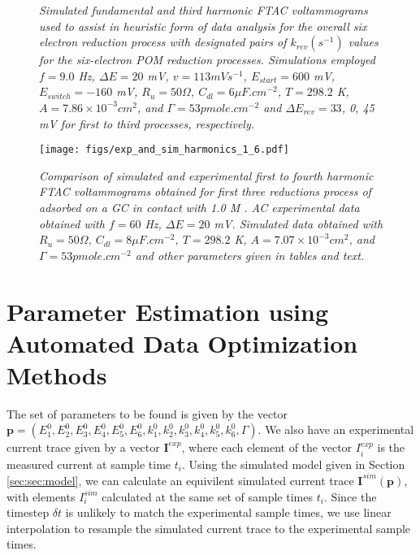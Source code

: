 \documentclass[a4paper, 12pt]{article}
\begin{document}
\begin{figure}[h]
    \caption{\it{Simulated fundamental and third harmonic FTAC voltammograms 
    used to assist in heuristic form of data analysis for the overall six 
    electron reduction process with designated pairs of $k_{rev} (s^{-1})$ 
    values for the six-electron POM reduction processes. Simulations employed $f 
    = 9.0$ Hz, $\Delta E = 20$ mV, $v = 113 mV s^{-1}$, $E_{start} = 600$ mV, 
    $E_{switch} = -160$ mV, $R_u = 50 \Omega$, $C_{dl} = 6 \mu F.cm^{-2}$, $T = 
    298.2$ K, $A = 7.86 \times 10^{-3} cm^2$, and $\Gamma = 53 pmole.cm^{-2}$ 
    and $\Delta E_{rev} = 33$, 0, 45 mV for first to third processes, 
    respectively.}}
    \label{fig:sim_for_heuristic_k}
\end{figure}

\begin{figure}[h]
\texttt{[image: figs/exp\_and\_sim\_harmonics\_1\_6.pdf]}
    \caption{\it{Comparison of simulated and experimental first to fourth 
    harmonic FTAC voltammograms obtained for first three reductions process of 
     adsorbed on a GC in contact with 1.0 M . AC 
    experimental data obtained with $f = 60$ Hz, $\Delta E = 20$ mV. Simulated 
    data obtained with $R_u = 50 \Omega$, $C_{dl} = 8 \mu F.cm^{-2}$, $T = 
    298.2$ K, $A = 7.07 \times 10^{-3} cm^2$, and $\Gamma = 53 pmole.cm^{-2}$ 
    and other parameters given in tables and text.}}
    \label{fig:sim_and_exp}
\end{figure}


\section{Parameter Estimation using Automated Data Optimization Methods}

The set of parameters to be found is given by the vector $\mathbf{p} =
(E^0_1,E^0_2,E^0_3,E^0_4,E^0_5,E^0_6,k^0_1,k^0_2,k^0_3,k^0_4,k^0_5,k^0_6,\Gamma)$.
We also have an experimental current trace given by a vector $\mathbf{I}^{exp}$,
where each element of the vector $I^{exp}_i$ is the measured current at sample
time $t_i$. Using the simulated model given in Section \ref{sec:sec:model}, we
can calculate an equivilent simulated current trace
$\mathbf{I}^{sim}(\mathbf{p})$, with elements $I^{sim}_i$ calculated at the same
set of sample times $t_i$. Since the timestep $\delta t$ is unlikely to match
the experimental sample times, we use linear interpolation to resample the
simulated current trace to the experimental sample times.
\end{document}
